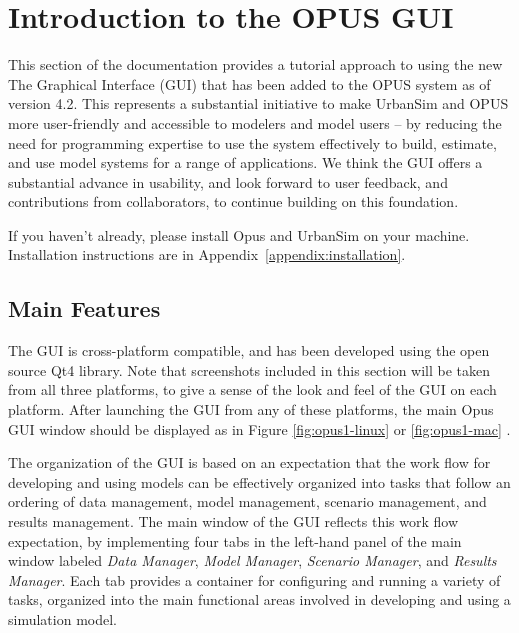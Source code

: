 \chapter{Introduction to the OPUS GUI}

This section of the documentation provides a tutorial approach to using the new The Graphical Interface (GUI) that has been added to the OPUS system as of version 4.2.  This represents a substantial initiative to make UrbanSim and OPUS more user-friendly and accessible to modelers and model users -- by reducing the need for programming expertise to use the system effectively to build, estimate, and use model systems for a range of applications.  We think the GUI offers a substantial advance in usability, and look forward to user feedback, and contributions from collaborators, to continue building on this foundation.

If you haven't already, please install Opus and UrbanSim on your machine.
Installation instructions are in Appendix~\ref{appendix:installation}.

\section{Main Features}

The GUI is cross-platform compatible, and has been developed using the open source Qt4 library.  
Note that screenshots included in this section will be taken from all three platforms, to give a 
sense of the look and feel of the GUI on each platform.  After launching the GUI from any of these platforms, 
the main Opus GUI window should be displayed as in Figure \ref{fig:opus1-linux} or \ref{fig:opus1-mac} . 

The organization of the GUI is based on an expectation that the work flow for developing and using models can be effectively organized into tasks that follow an ordering of data management, model management, scenario management, and results management.  The main window of the GUI reflects this work flow expectation, by implementing four tabs in the left-hand panel of the main window labeled \emph{Data Manager}, \emph{Model Manager}, \emph{Scenario Manager}, and \emph{Results Manager}.  Each tab provides a container for configuring and running a variety of tasks, organized into the main functional areas involved in developing and using a simulation model.  

